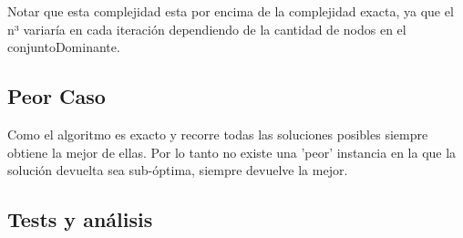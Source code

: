 Notar que esta complejidad esta por encima de la complejidad exacta, ya que el n³ variaría en cada iteración dependiendo de la cantidad de nodos en el conjuntoDominante.


\subsection{Peor Caso}

Como el algoritmo es exacto y recorre todas las soluciones posibles siempre obtiene la mejor de ellas. Por lo tanto no existe una 'peor' instancia
en la que la solución devuelta sea sub-óptima, siempre devuelve la mejor.

\subsection{Tests y análisis}



